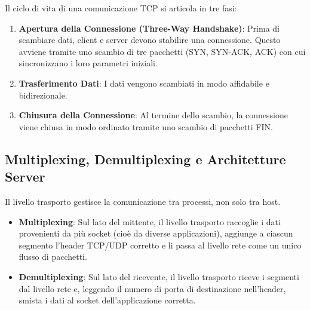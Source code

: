 
Il ciclo di vita di una comunicazione TCP si articola in tre fasi:
\begin{enumerate}
    \item \textbf{Apertura della Connessione (Three-Way Handshake)}: Prima di scambiare dati, client e server devono stabilire una connessione. Questo avviene tramite uno scambio di tre pacchetti (SYN, SYN-ACK, ACK) con cui sincronizzano i loro parametri iniziali.
    \item \textbf{Trasferimento Dati}: I dati vengono scambiati in modo affidabile e bidirezionale.
    \item \textbf{Chiusura della Connessione}: Al termine dello scambio, la connessione viene chiusa in modo ordinato tramite uno scambio di pacchetti FIN.
\end{enumerate}



\subsection{Multiplexing, Demultiplexing e Architetture Server}
Il livello trasporto gestisce la comunicazione tra processi, non solo tra host.
\begin{itemize}
    \item \textbf{Multiplexing}: Sul lato del mittente, il livello trasporto raccoglie i dati provenienti da più socket (cioè da diverse applicazioni), aggiunge a ciascun segmento l'header TCP/UDP corretto e li passa al livello rete come un unico flusso di pacchetti.
    \item \textbf{Demultiplexing}: Sul lato del ricevente, il livello trasporto riceve i segmenti dal livello rete e, leggendo il numero di porta di destinazione nell'header, smista i dati al socket dell'applicazione corretta.
\end{itemize}

